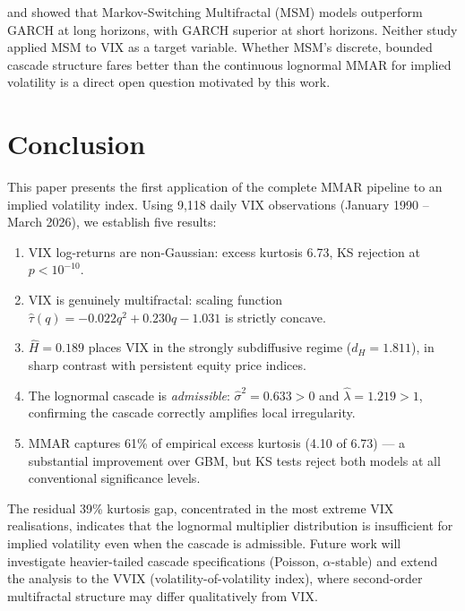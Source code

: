 \documentclass[12pt,a4paper]{article}
\begin{document}
\citet{luxliu2017} and \citet{liu2019} showed that Markov-Switching
Multifractal (MSM) models outperform GARCH at long horizons, with GARCH
superior at short horizons. Neither study applied MSM to VIX as a
target variable. Whether MSM's discrete, bounded cascade structure
fares better than the continuous lognormal MMAR for implied volatility
is a direct open question motivated by this work.

\section{Conclusion}

This paper presents the first application of the complete MMAR pipeline
to an implied volatility index. Using 9,118 daily VIX observations
(January 1990 -- March 2026), we establish five results:
\begin{enumerate}
  \item VIX log-returns are non-Gaussian: excess kurtosis 6.73,
    KS rejection at $p < 10^{-10}$.
  \item VIX is genuinely multifractal: scaling function
    $\hat{\tau}(q) = -0.022q^2 + 0.230q - 1.031$ is strictly
    concave.
  \item $\hat{H} = 0.189$ places VIX in the strongly subdiffusive
    regime ($d_H = 1.811$), in sharp contrast with persistent equity
    price indices.
  \item The lognormal cascade is \emph{admissible}:
    $\hat{\sigma}^2 = 0.633 > 0$ and $\hat{\lambda} = 1.219 > 1$,
    confirming the cascade correctly amplifies local irregularity.
  \item MMAR captures 61\% of empirical excess kurtosis (4.10 of
    6.73) --- a substantial improvement over GBM, but KS tests reject
    both models at all conventional significance levels.
\end{enumerate}

The residual 39\% kurtosis gap, concentrated in the most extreme VIX
realisations, indicates that the lognormal multiplier distribution is
insufficient for implied volatility even when the cascade is admissible.
Future work will investigate heavier-tailed cascade specifications
(Poisson, $\alpha$-stable) and extend the analysis to the VVIX
(volatility-of-volatility index), where second-order multifractal
structure may differ qualitatively from VIX.

\end{document}
